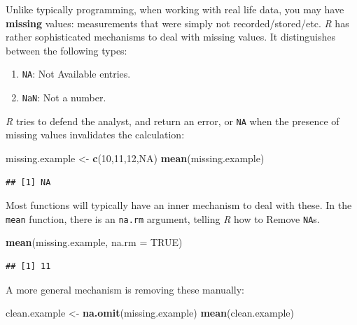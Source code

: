 \documentclass[]{book}
\newenvironment{Shaded}{\begin{snugshade}}{\end{snugshade}}
\newcommand{\KeywordTok}[1]{\textcolor[rgb]{0.13,0.29,0.53}{\textbf{#1}}}
\newcommand{\DataTypeTok}[1]{\textcolor[rgb]{0.13,0.29,0.53}{#1}}
\newcommand{\DecValTok}[1]{\textcolor[rgb]{0.00,0.00,0.81}{#1}}
\newcommand{\StringTok}[1]{\textcolor[rgb]{0.31,0.60,0.02}{#1}}
\newcommand{\OtherTok}[1]{\textcolor[rgb]{0.56,0.35,0.01}{#1}}
\newcommand{\NormalTok}[1]{#1}
\providecommand{\tightlist}{%
  \setlength{\itemsep}{0pt}\setlength{\parskip}{0pt}}
\theoremstyle{definition}
\theoremstyle{definition}
\theoremstyle{definition}
\theoremstyle{remark}
\begin{document}
Unlike typically programming, when working with real life data, you may
have \textbf{missing} values: measurements that were simply not
recorded/stored/etc. \emph{R} has rather sophisticated mechanisms to
deal with missing values. It distinguishes between the following types:

\begin{enumerate}
\def\labelenumi{\arabic{enumi}.}
\tightlist
\item
  \texttt{NA}: Not Available entries.
\item
  \texttt{NaN}: Not a number.
\end{enumerate}

\emph{R} tries to defend the analyst, and return an error, or
\texttt{NA} when the presence of missing values invalidates the
calculation:

\begin{Shaded}
\begin{Highlighting}[]
\NormalTok{missing.example <-}\StringTok{ }\KeywordTok{c}\NormalTok{(}\DecValTok{10}\NormalTok{,}\DecValTok{11}\NormalTok{,}\DecValTok{12}\NormalTok{,}\OtherTok{NA}\NormalTok{)}
\KeywordTok{mean}\NormalTok{(missing.example)}
\end{Highlighting}
\end{Shaded}

\begin{verbatim}
## [1] NA
\end{verbatim}

Most functions will typically have an inner mechanism to deal with
these. In the \texttt{mean} function, there is an \texttt{na.rm}
argument, telling \emph{R} how to Remove \texttt{NA}s.

\begin{Shaded}
\begin{Highlighting}[]
\KeywordTok{mean}\NormalTok{(missing.example, }\DataTypeTok{na.rm =} \OtherTok{TRUE}\NormalTok{)}
\end{Highlighting}
\end{Shaded}

\begin{verbatim}
## [1] 11
\end{verbatim}

A more general mechanism is removing these manually:

\begin{Shaded}
\begin{Highlighting}[]
\NormalTok{clean.example <-}\StringTok{ }\KeywordTok{na.omit}\NormalTok{(missing.example)}
\KeywordTok{mean}\NormalTok{(clean.example)}
\end{Highlighting}
\end{Shaded}
\end{document}
